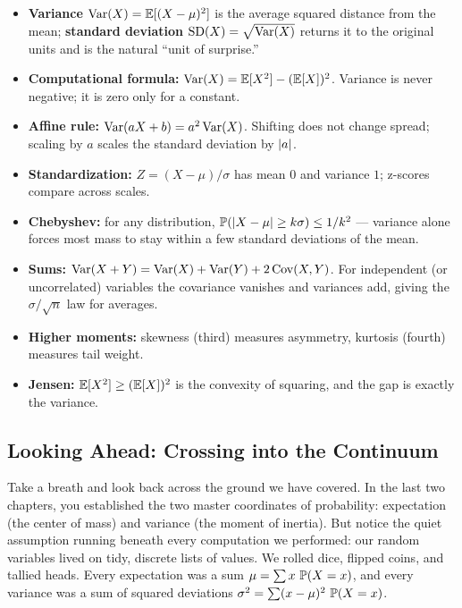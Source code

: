 \begin{itemize}
  \item \textbf{Variance} $\Var(X) = \E[(X-\mu)^2]$ is the average squared
        distance from the mean; \textbf{standard deviation}
        $\SD(X)=\sqrt{\Var(X)}$ returns it to the original units and is the
        natural ``unit of surprise.''
  \item \textbf{Computational formula:}
        $\Var(X) = \E[X^2] - (\E[X])^2$. Variance is never negative; it is
        zero only for a constant.
  \item \textbf{Affine rule:} $\Var(aX+b) = a^2\Var(X)$. Shifting does not
        change spread; scaling by $a$ scales the standard deviation by
        $\abs a$.
  \item \textbf{Standardization:} $Z = (X-\mu)/\sigma$ has mean $0$ and
        variance $1$; z-scores compare across scales.
  \item \textbf{Chebyshev:} for any distribution,
        $\P(\abs{X-\mu}\ge k\sigma)\le 1/k^2$ --- variance alone forces most
        mass to stay within a few standard deviations of the mean.
  \item \textbf{Sums:} $\Var(X+Y) = \Var(X)+\Var(Y)+2\Cov(X,Y)$. For
        independent (or uncorrelated) variables the covariance vanishes and
        variances add, giving the $\sigma/\sqrt n$ law for averages.
  \item \textbf{Higher moments:} skewness (third) measures asymmetry,
        kurtosis (fourth) measures tail weight.
  \item \textbf{Jensen:} $\E[X^2]\ge(\E[X])^2$ is the convexity of squaring,
        and the gap is exactly the variance.
\end{itemize}

\subsection*{Looking Ahead: Crossing into the Continuum}

Take a breath and look back across the ground we have covered. In the last two
chapters, you established the two master coordinates of probability:
expectation (the center of mass) and variance (the moment of inertia). But notice
the quiet assumption running beneath every computation we performed: our random
variables lived on tidy, discrete lists of values. We rolled dice, flipped coins,
and tallied heads. Every expectation was a sum $\mu = \sum x\,\P(X=x)$, and every
variance was a sum of squared deviations $\sigma^2 = \sum (x-\mu)^2\,\P(X=x)$.

